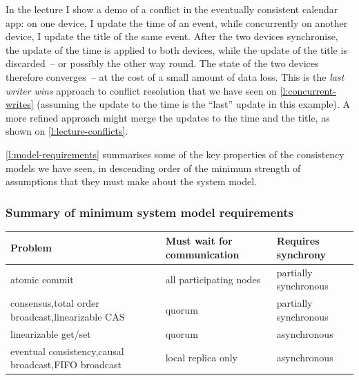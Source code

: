In the lecture I show a demo of a conflict in the eventually consistent calendar app: on one device, I update the time of an event, while concurrently on another device, I update the title of the same event.
After the two devices synchronise, the update of the time is applied to both devices, while the update of the title is discarded~-- or possibly the other way round.
The state of the two devices therefore converges~-- at the cost of a small amount of data loss.
This is the \emph{last writer wins} approach to conflict resolution that we have seen on \autoref{l:concurrent-writes} (assuming the update to the time is the ``last'' update in this example).
A more refined approach might merge the updates to the time and the title, as shown on \autoref{l:lecture-conflicts}.

\autoref{l:model-requirements} summarises some of the key properties of the consistency models we have seen, in descending order of the minimum strength of assumptions that they must make about the system model.


\begin{frame}
    \label{s:model-requirements}
    \frametitle{Summary of minimum system model requirements}
    \renewcommand{\arraystretch}{1.5}%
    \begin{tabular}{>{\raggedright}p{3.7cm}|>{\raggedright}p{3cm}|>{\raggedright\arraybackslash}p{2.4cm}} %
        \textbf{Problem} & \textbf{Must wait for communication} & \textbf{Requires synchrony} \\\hline
        atomic commit & all participating nodes & partially synchronous\pause\\
        consensus,\newline total order broadcast,\newline linearizable CAS & quorum & partially synchronous\pause\\
        linearizable get/set & quorum & asynchronous\pause\\
        eventual consistency,\newline causal broadcast,\newline FIFO broadcast & local replica only & asynchronous \\\hline
    \end{tabular}
\end{frame}
\label{l:model-requirements}


